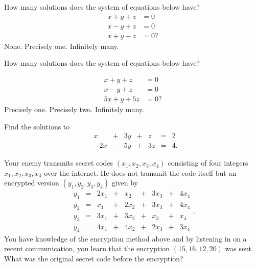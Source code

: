 \documentclass{article}
\begin{document}
\begin{quizexercise}[showhide]
 \begin{quiz}
\question
How many solutions does the system of equations below have?
\begin{align*}
x + y + z &= 0\\
x - y + z &= 0\\
x + y - z &= 0?
\end{align*}
None.
Precisely one.
Infinitely many.
\end{quiz}
\end{quizexercise}


\begin{quizexercise}[showhide]
How many solutions does the system of equations below have?
  \begin{quiz}
\question

\begin{align*}
x + y + z &= 0\\
x - y + z &= 0\\
5 x + y +5z &= 0?
\end{align*}
Precisely one.
Precisely two.
Infinitely many.
\end{quiz}
\end{quizexercise}

\beginshex
Find the solutions to
$$
\begin{matrix}
& x &+ &3 y &+ &z &= &2\\
&-2 x &- &5 y &+ &3 z &= &4.
\end{matrix}
$$
\endshex


\beginshex
Your enemy transmits secret codes $(x_1, x_2, x_3, x_4)$ consisting of four integers $x_1, x_2, x_3, x_4$ over the internet. He does
not transmit the code itself but an encrypted version $(y_1, y_2, y_3, y_4)$ given by
\begin{equation*}
\begin{matrix}
  y_1 &= &2 x_1 &+ &x_2 &+ &3 x_3 &+  &4 x_4\\
  y_2 &= &x_1 &+ &2 x_2 &+ &3 x_3 &+  &4 x_4\\
  y_3 &= &3 x_1 &+ &3 x_2 &+ &x_3 &+  &x_4\\
  y_4 &= &4 x_1 &+ &4 x_2 &+ &2 x_3 &+  &3 x_4
\end{matrix}.
\end{equation*}
You have knowledge of the encryption method above and by listening in on
a recent communication, you learn that the encryption
$(15, 16, 12, 20)$ was sent. What was the original secret code before the encryption?
\end{document}
